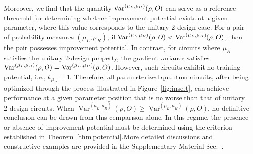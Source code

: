 \documentclass[%
 reprint,
 superscriptaddress,
 amsmath,amssymb,
 aps, prl, twocolumn, showpacs,
]{revtex4-2}
\newcommand{\RomanNumeralCaps}[1]
    {\MakeUppercase{\romannumeral #1}}
\begin{document}
Moreover, we find that the quantity ${\rm Var}^{(\mu_L, \mu_H)}(\rho, O)$ can serve as a reference threshold for determining whether improvement potential exists at a given parameter, where this value corresponds to the unitary 2-design case. For a pair of probability measures $(\mu_L, \mu_R)$, if ${\rm Var}^{(\mu_L, \mu_R)}(\rho, O) < {\rm Var}^{(\mu_L, \mu_H)}(\rho, O)$, then the pair possesses improvement potential. In contrast, for circuits where $\mu_R$ satisfies the unitary 2-design property, the gradient variance satisfies ${\rm Var}^{(\mu_L, \mu_R)}(\rho, O) = {\rm Var}^{(\mu_L, \mu_H)}(\rho, O)$. However, such circuits exhibit no training potential, i.e., $k_{\mu_R} = 1$. Therefore, all parameterized quantum circuits, after being optimized through the process illustrated in Figure~\ref{fig:insert}, can achieve performance at a given parameter position that is no worse than that of unitary 2-design circuits. When $\operatorname{Var}^{(\mu_L, \mu_R)}(\rho, O) \geq \operatorname{Var}^{(\mu_L, \mu_H)}(\rho, O)$, no definitive conclusion can be drawn from this comparison alone. In this regime, the presence or absence of improvement potential must be determined using the criterion established in Theorem~\ref{thm:potential}.More detailed discussions and constructive examples are provided in the Supplementary Material Sec.~\RomanNumeralCaps{4}.

\end{document}
